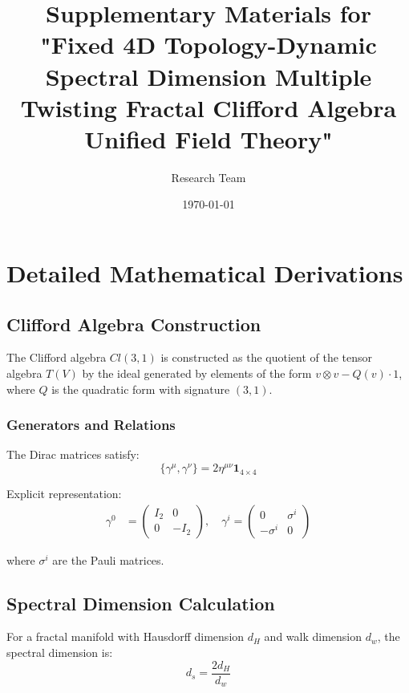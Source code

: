 \documentclass[12pt,a4paper]{article}
\title{Supplementary Materials for\\
"Fixed 4D Topology-Dynamic Spectral Dimension Multiple Twisting Fractal Clifford Algebra Unified Field Theory"}
\author{Research Team}
\date{\today}
\begin{document}
\maketitle

\tableofcontents
\newpage

\section{Detailed Mathematical Derivations}

\subsection{Clifford Algebra Construction}

The Clifford algebra $Cl(3,1)$ is constructed as the quotient of the tensor algebra $T(V)$ by the ideal generated by elements of the form $v \otimes v - Q(v) \cdot 1$, where $Q$ is the quadratic form with signature $(3,1)$.

\subsubsection{Generators and Relations}

The Dirac matrices satisfy:
\begin{equation}
    \{\gamma^\mu, \gamma^\nu\} = 2\eta^{\mu\nu} \mathbf{1}_{4\times 4}
\end{equation}

Explicit representation:
\begin{align}
    \gamma^0 &= \begin{pmatrix} I_2 & 0 \\ 0 & -I_2 \end{pmatrix}, \quad
    \gamma^i = \begin{pmatrix} 0 & \sigma^i \\ -\sigma^i & 0 \end{pmatrix}
\end{align}

where $\sigma^i$ are the Pauli matrices.

\subsection{Spectral Dimension Calculation}

For a fractal manifold with Hausdorff dimension $d_H$ and walk dimension $d_w$, the spectral dimension is:
\begin{equation}
    d_s = \frac{2d_H}{d_w}
\end{equation}
\end{document}
